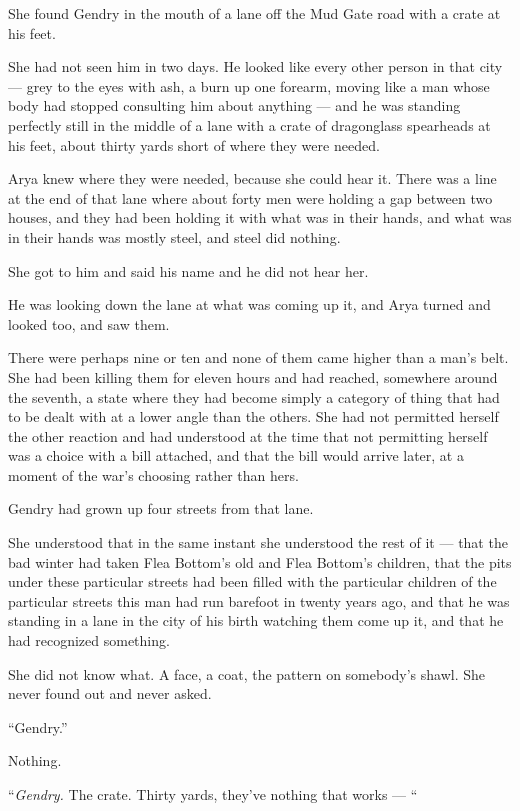\sceneBreak

She found Gendry in the mouth of a lane off the Mud Gate road with a crate at his feet.

She had not seen him in two days. He looked like every other person in that city — grey to the eyes with ash, a burn up one forearm, moving like a man whose body had stopped consulting him about anything — and he was standing perfectly still in the middle of a lane with a crate of dragonglass spearheads at his feet, about thirty yards short of where they were needed.

Arya knew where they were needed, because she could hear it. There was a line at the end of that lane where about forty men were holding a gap between two houses, and they had been holding it with what was in their hands, and what was in their hands was mostly steel, and steel did nothing.

She got to him and said his name and he did not hear her.

He was looking down the lane at what was coming up it, and Arya turned and looked too, and saw them.

There were perhaps nine or ten and none of them came higher than a man’s belt. She had been killing them for eleven hours and had reached, somewhere around the seventh, a state where they had become simply a category of thing that had to be dealt with at a lower angle than the others. She had not permitted herself the other reaction and had understood at the time that not permitting herself was a choice with a bill attached, and that the bill would arrive later, at a moment of the war’s choosing rather than hers.

Gendry had grown up four streets from that lane.

She understood that in the same instant she understood the rest of it — that the bad winter had taken Flea Bottom’s old and Flea Bottom’s children, that the pits under these particular streets had been filled with the particular children of the particular streets this man had run barefoot in twenty years ago, and that he was standing in a lane in the city of his birth watching them come up it, and that he had recognized something.

She did not know what. A face, a coat, the pattern on somebody’s shawl. She never found out and never asked.

“Gendry.”

Nothing.

“\textit{Gendry.} The crate. Thirty yards, they’ve nothing that works — “

